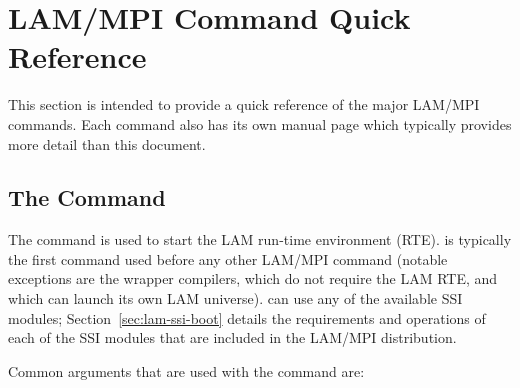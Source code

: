 %
% 
%
%

\chapter{LAM/MPI Command Quick Reference}
\label{sec:commands}

This section is intended to provide a quick reference of the major
LAM/MPI commands.  Each command also has its own manual page which
typically provides more detail than this document.


\section{The  Command}
\label{sec:commands-lamboot}

The  command is used to start the LAM run-time
environment (RTE).   is typically the first command used
before any other LAM/MPI command (notable exceptions are the wrapper
compilers, which do not require the LAM RTE, and  which
can launch its own LAM universe).   can use any of the
available  SSI modules; Section~\ref{sec:lam-ssi-boot}
details the requirements and operations of each of the  SSI
modules that are included in the LAM/MPI distribution.

Common arguments that are used with the  command are:

